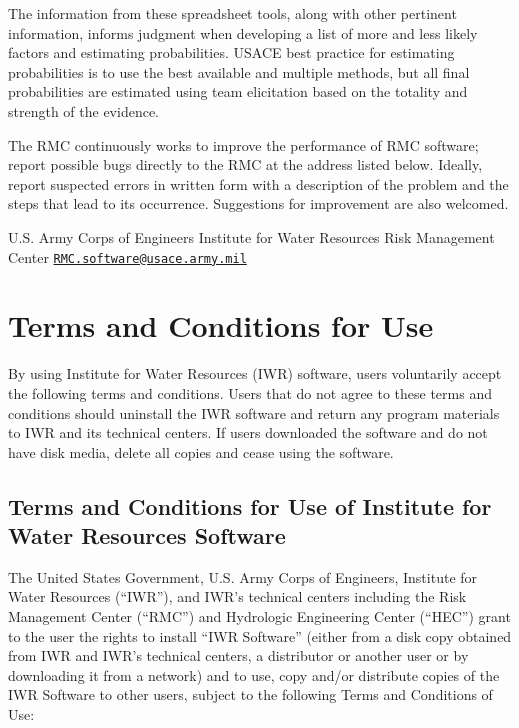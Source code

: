 \documentclass[
]{book}
\begin{document}
The information from these spreadsheet tools, along with other pertinent information, informs judgment when developing a list of more and less likely factors and estimating probabilities. USACE best practice for estimating probabilities is to use the best available and multiple methods, but all final probabilities are estimated using team elicitation based on the totality and strength of the evidence.

The RMC continuously works to improve the performance of RMC software; report possible bugs directly to the RMC at the address listed below. Ideally, report suspected errors in written form with a description of the problem and the steps that lead to its occurrence. Suggestions for improvement are also welcomed.

U.S. Army Corps of Engineers
Institute for Water Resources
Risk Management Center
\href{mailto:RMC.software@usace.army.mil}{\nolinkurl{RMC.software@usace.army.mil}}

\chapter{Terms and Conditions for Use}\label{terms-and-conditions-for-use}

By using Institute for Water Resources (IWR) software, users voluntarily accept the following terms and conditions. Users that do not agree to these terms and conditions should uninstall the IWR software and return any program materials to IWR and its technical centers. If users downloaded the software and do not have disk media, delete all copies and cease using the software.

\section{Terms and Conditions for Use of Institute for Water Resources Software}\label{terms-and-conditions-for-use-of-institute-for-water-resources-software}

The United States Government, U.S. Army Corps of Engineers, Institute for Water Resources (``IWR''), and IWR's technical centers including the Risk Management Center (``RMC'') and Hydrologic Engineering Center (``HEC'') grant to the user the rights to install ``IWR Software'' (either from a disk copy obtained from IWR and IWR's technical centers, a distributor or another user or by downloading it from a network) and to use, copy and/or distribute copies of the IWR Software to other users, subject to the following Terms and Conditions of Use:
\end{document}

